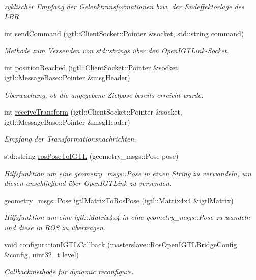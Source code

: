 \begin{DoxyCompactItemize}
\begin{DoxyCompactList}\small\item\em zyklischer Empfang der Gelenktransformationen bzw. der Endeffektorlage des L\-B\-R \end{DoxyCompactList}\item 
int \hyperlink{classRosOpenIgtlBridge_a741e133a8fbd1fed1508ec636723de5a}{send\-Command} (igtl\-::\-Client\-Socket\-::\-Pointer \&socket, std\-::string command)
\begin{DoxyCompactList}\small\item\em Methode zum Versenden von std\-::strings über den Open\-I\-G\-T\-Link-\/\-Socket. \end{DoxyCompactList}\item 
int \hyperlink{classRosOpenIgtlBridge_aa375549cb5b12c850c363a992eb87340}{position\-Reached} (igtl\-::\-Client\-Socket\-::\-Pointer \&socket, igtl\-::\-Message\-Base\-::\-Pointer \&msg\-Header)
\begin{DoxyCompactList}\small\item\em Überwachung, ob die angegebene Zielpose bereits erreicht wurde. \end{DoxyCompactList}\item 
int \hyperlink{classRosOpenIgtlBridge_a051b146bbe2dd3d1ea63677efeb62155}{receive\-Transform} (igtl\-::\-Client\-Socket\-::\-Pointer \&socket, igtl\-::\-Message\-Base\-::\-Pointer \&msg\-Header)
\begin{DoxyCompactList}\small\item\em Empfang der Transformationsnachrichten. \end{DoxyCompactList}\item 
std\-::string \hyperlink{classRosOpenIgtlBridge_a99c187746613fa369b79e73c2ccb7c62}{ros\-Pose\-To\-I\-G\-T\-L} (geometry\-\_\-msgs\-::\-Pose pose)
\begin{DoxyCompactList}\small\item\em Hilfsfunktion um eine geometry\-\_\-msgs\-::\-Pose in einen String zu verwandeln, um diesen anschließend über Open\-I\-G\-T\-Link zu versenden. \end{DoxyCompactList}\item 
geometry\-\_\-msgs\-::\-Pose \hyperlink{classRosOpenIgtlBridge_ac9e20d912d93a8c7723511a255033cae}{igtl\-Matrix\-To\-Ros\-Pose} (igtl\-::\-Matrix4x4 \&igtl\-Matrix)
\begin{DoxyCompactList}\small\item\em Hilfsfunktion um eine igtl\-::\-Matrix4x4 in eine geometry\-\_\-msgs\-::\-Pose zu wandeln und diese in R\-O\-S zu übertragen. \end{DoxyCompactList}\item 
void \hyperlink{classRosOpenIgtlBridge_a6efbb5bd82d24454e040ea03549d4426}{configuration\-I\-G\-T\-L\-Callback} (masterslave\-::\-Ros\-Open\-I\-G\-T\-L\-Bridge\-Config \&config, uint32\-\_\-t level)
\begin{DoxyCompactList}\small\item\em Callbackmethode für dynamic reconfigure. \end{DoxyCompactList}\end{DoxyCompactItemize}
